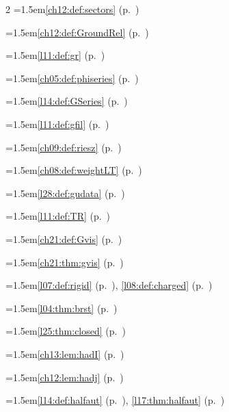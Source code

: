 \begin{multicols}{2}
\hangindent=1.5em\quad \ref{ch12:def:sectors} (p.~\pageref{ch12:def:sectors})\par
\hangindent=1.5em\quad \ref{ch12:def:GroundRel} (p.~\pageref{ch12:def:GroundRel})\par
\hangindent=1.5em\quad \ref{l11:def:gr} (p.~\pageref{l11:def:gr})\par
\hangindent=1.5em\quad \ref{ch05:def:phiseries} (p.~\pageref{ch05:def:phiseries})\par
\hangindent=1.5em\quad \ref{l14:def:GSeries} (p.~\pageref{l14:def:GSeries})\par
\hangindent=1.5em\quad \ref{l11:def:gfil} (p.~\pageref{l11:def:gfil})\par
\hangindent=1.5em\quad \ref{ch09:def:riesz} (p.~\pageref{ch09:def:riesz})\par
\hangindent=1.5em\quad \ref{ch08:def:weightLT} (p.~\pageref{ch08:def:weightLT})\par
\hangindent=1.5em\quad \ref{l28:def:gudata} (p.~\pageref{l28:def:gudata})\par
\hangindent=1.5em\quad \ref{l11:def:TR} (p.~\pageref{l11:def:TR})\par
\hangindent=1.5em\quad \ref{ch21:def:Gvis} (p.~\pageref{ch21:def:Gvis})\par
\hangindent=1.5em\quad \ref{ch21:thm:gvis} (p.~\pageref{ch21:thm:gvis})\par
\par{}\par\nopagebreak\smallskip
\hangindent=1.5em\quad \ref{l07:def:rigid} (p.~\pageref{l07:def:rigid}), \ref{l08:def:charged} (p.~\pageref{l08:def:charged})\par
\hangindent=1.5em\quad \ref{l04:thm:brst} (p.~\pageref{l04:thm:brst})\par
\hangindent=1.5em\quad \ref{l25:thm:closed} (p.~\pageref{l25:thm:closed})\par
\hangindent=1.5em\quad \ref{ch13:lem:hadI} (p.~\pageref{ch13:lem:hadI})\par
\hangindent=1.5em\quad \ref{ch12:lem:hadj} (p.~\pageref{ch12:lem:hadj})\par
\hangindent=1.5em\quad \ref{l14:def:halfaut} (p.~\pageref{l14:def:halfaut}), \ref{l17:thm:halfaut} (p.~\pageref{l17:thm:halfaut})\par

\end{multicols}
